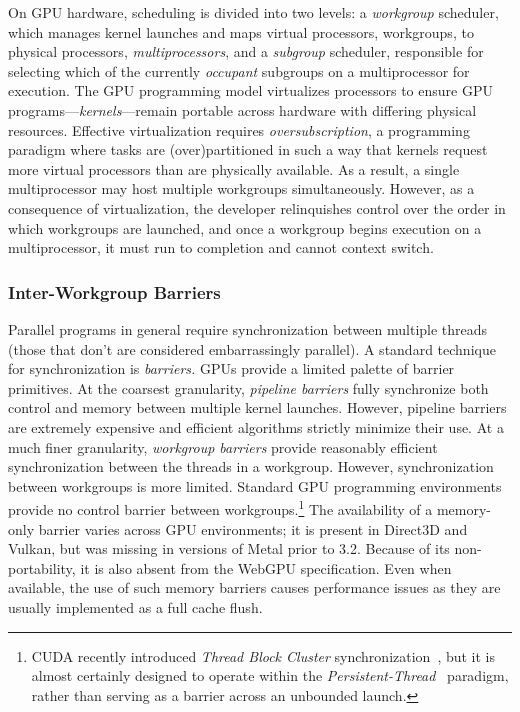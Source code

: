 \documentclass[sigconf]{acmart}
\begin{document}
On GPU hardware, scheduling is divided into two levels: a \emph{workgroup} scheduler, which manages kernel launches and maps virtual processors, workgroups, to physical processors, \emph{multiprocessors}, and a \emph{subgroup} scheduler, responsible for selecting which of the currently \emph{occupant} subgroups on a multiprocessor for execution. The GPU programming model virtualizes processors to ensure GPU programs---\emph{kernels}---remain portable across hardware with differing physical resources. Effective virtualization requires \emph{oversubscription}, a programming paradigm where tasks are (over)partitioned in such a way that kernels request more virtual processors than are physically available. As a result, a single multiprocessor may host multiple workgroups simultaneously. However, as a consequence of virtualization, the developer relinquishes control over the order in which workgroups are launched, and once a workgroup begins execution on a multiprocessor, it must run to completion and cannot context switch.

\subsubsection{Inter-Workgroup Barriers}
Parallel programs in general require synchronization between multiple threads (those that don't are considered embarrassingly parallel). A standard technique for synchronization is \emph{barriers.} GPUs provide a limited palette of barrier primitives. At the coarsest granularity, \emph{pipeline barriers} fully synchronize both control and memory between multiple kernel launches. However, pipeline barriers are extremely expensive and efficient algorithms strictly minimize their use. At a much finer granularity, \emph{workgroup barriers} provide reasonably efficient synchronization between the threads in a workgroup. However, synchronization between workgroups is more limited. Standard GPU programming environments provide no control barrier between workgroups.\footnote{CUDA recently introduced \emph{Thread Block Cluster} synchronization~\cite{NvidiaCudaGuide}, but it is almost certainly designed to operate within the \emph{Persistent-Thread}~\cite{gupta2012} paradigm, rather than serving as a barrier across an unbounded launch.} The availability of a memory-only barrier varies across GPU environments; it is present in Direct3D and Vulkan, but was missing in versions of Metal prior to 3.2. Because of its non-portability, it is also absent from the WebGPU specification. Even when available, the use of such memory barriers causes performance issues as they are usually implemented as a full cache flush.
\end{document}
